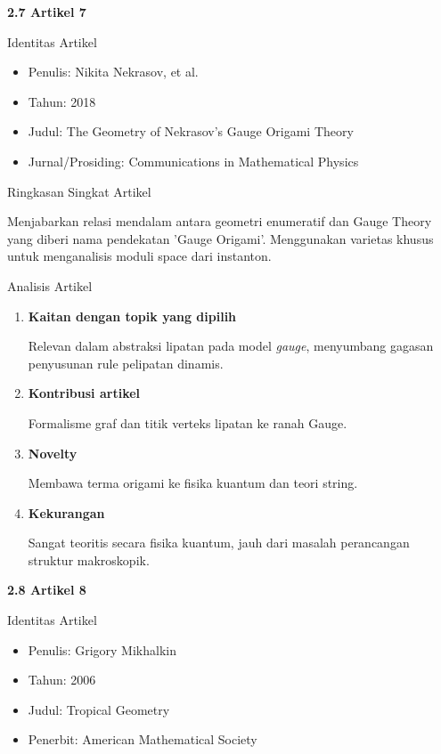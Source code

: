 \documentclass[12pt,a4paper]{article}
\begin{document}
\newpage
\noindent\textbf{\large 2.7 Artikel 7 \cite{nekrasov2018geometry}}\par

\noindent Identitas Artikel
\begin{itemize}
      \item[-] Penulis: Nikita Nekrasov, et al.
      \item[-] Tahun: 2018
      \item[-] Judul: The Geometry of Nekrasov's Gauge Origami Theory
      \item[-] Jurnal/Prosiding: Communications in Mathematical Physics
\end{itemize}

\noindent Ringkasan Singkat Artikel\par
Menjabarkan relasi mendalam antara geometri enumeratif dan Gauge Theory yang diberi nama pendekatan 'Gauge Origami'. Menggunakan varietas khusus untuk menganalisis moduli space dari instanton.

\noindent Analisis Artikel
\begin{enumerate}
      \item \textbf{Kaitan dengan topik yang dipilih}\par Relevan dalam abstraksi lipatan pada model \textit{gauge}, menyumbang gagasan penyusunan rule pelipatan dinamis.
      \item \textbf{Kontribusi artikel}\par Formalisme graf dan titik verteks lipatan ke ranah Gauge.
      \item \textbf{Novelty}\par Membawa terma origami ke fisika kuantum dan teori string.
      \item \textbf{Kekurangan}\par Sangat teoritis secara fisika kuantum, jauh dari masalah perancangan struktur makroskopik.
\end{enumerate}

\newpage
\noindent\textbf{\large 2.8 Artikel 8 \cite{mikhalkin2006tropical}}\par

\noindent Identitas Artikel
\begin{itemize}
      \item[-] Penulis: Grigory Mikhalkin
      \item[-] Tahun: 2006
      \item[-] Judul: Tropical Geometry
      \item[-] Penerbit: American Mathematical Society
\end{itemize}
\end{document}
